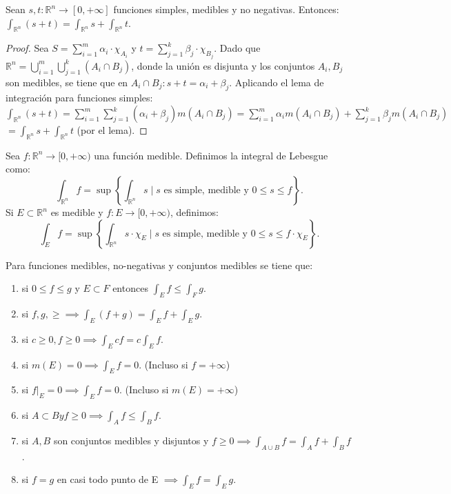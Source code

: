 \begin{corolario}
    Sean $s, t: \mathbb{R}^n \to [0, +\infty]$ funciones simples, medibles y no negativas. Entonces:
    $\int_{\mathbb{R}^n}(s + t) = \int_{\mathbb{R}^n}s + \int_{\mathbb{R}^n}t$.
\end{corolario}
\begin{proof}
    Sea $S = \sum_{i=1}^{m} \alpha_i \cdot \chi_{A_i}$ y $t = \sum_{j=1}^{k} \beta_j \cdot \chi_{B_j}$. Dado que $\mathbb{R}^n = \bigcup_{i=1}^{m} \bigcup_{j=1}^{k} (A_i \cap B_j)$, donde la unión es disjunta y los conjuntos $A_i, B_j$ son medibles, se tiene que en $A_i \cap B_j: s + t = \alpha_i + \beta_j$.
    Aplicando el lema de integración para funciones simples: $\int_{\mathbb{R}^n} (s + t) = \sum_{i=1}^{m} \sum_{j=1}^{k} (\alpha_i + \beta_j) m(A_i \cap B_j) = \sum_{i=1}^{m} \alpha_i m(A_i \cap B_j) + \sum_{j=1}^{k} \beta_j m(A_i \cap B_j)$
    $= \int_{\mathbb{R}^n} s + \int_{\mathbb{R}^n} t$ (por el lema).
\end{proof}
\begin{definición}
Sea $f: \mathbb{R}^n \to [0, +\infty)$ una función medible. Definimos la integral de Lebesgue como:
$$\int_{\mathbb{R}^n} f = \sup \left\{ \int_{\mathbb{R}^n} s \mid s \text{ es simple, medible y } 0 \leq s \leq f \right\}.$$
Si $E \subset \mathbb{R}^n$ es medible y $f: E \to [0, +\infty)$, definimos:
$$\int_E f = \sup \left\{ \int_{\mathbb{R}^n} s \cdot \chi_E \mid s \text{ es simple, medible y } 0 \leq s \leq f \cdot \chi_E \right\}.$$
\end{definición}
\begin{proposición}
Para funciones medibles, no-negativas y conjuntos medibles se tiene que:
\vspace{-0.5em}
\begin{enumerate}
    \item si $0 \leq f \leq g$ y $E \subset F$ entonces $\int_E f \leq \int_F g$.
    \item si $f, g, \geq \implies \int_E (f + g) = \int_E f + \int_E g$.
    \item si $c \geq 0, f \geq 0 \implies \int_E cf = c \int_E f$.
    \item si $m(E) = 0 \implies \int_E f = 0$. (Incluso si $f = +\infty$)
    \item si $f\big|_E = 0 \implies \int_E f = 0$. (Incluso si $m(E) = +\infty$)
    \item si $A \subset B y f \geq 0 \implies \int_A f \leq \int_B f$.
    \item si $A, B$ son conjuntos medibles y disjuntos y $f\geq 0 \implies \int_{A \cup
                  B} f = \int_A f + \int_B f$.
    \item si $f = g$ en casi todo punto de E $\implies \int_E f = \int_E g$.
\end{enumerate}
\end{proposición}
